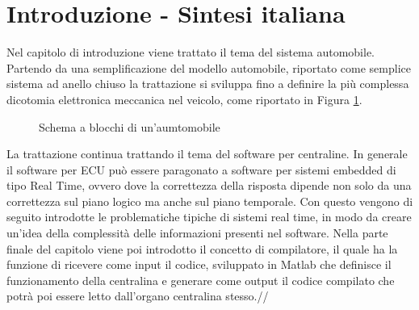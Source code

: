 \documentclass[../main.tex]{subfiles}
\begin{document}
\section{Introduzione - Sintesi italiana}
Nel capitolo di introduzione viene trattato il tema del sistema automobile. Partendo da una semplificazione del modello automobile, riportato come semplice sistema ad anello chiuso la trattazione si sviluppa fino a definire la più complessa dicotomia elettronica meccanica nel veicolo, come riportato in Figura \ref{fig:schemaablocchi}.
\begin{figure}[ht]
        \begin{center}
        \end{center}
        \caption{Schema a blocchi di un'aumtomobile}
        \label{fig:schemaablocchi}
    \end{figure}
La trattazione continua trattando il tema del software per centraline. In generale il software per \gls{ECU} può essere paragonato a software per sistemi embedded di tipo Real Time, ovvero dove la correttezza della risposta dipende non solo da una correttezza sul piano logico ma anche sul piano temporale. Con questo vengono di seguito introdotte le problematiche tipiche di sistemi real time, in modo da creare un'idea della complessità delle informazioni presenti nel software. 
Nella parte finale del capitolo viene poi introdotto il concetto di compilatore, il quale ha la funzione di ricevere come input il codice, sviluppato in Matlab che definisce il funzionamento della centralina e generare come output il codice compilato che potrà poi essere letto dall'organo centralina stesso.//
\end{document}
